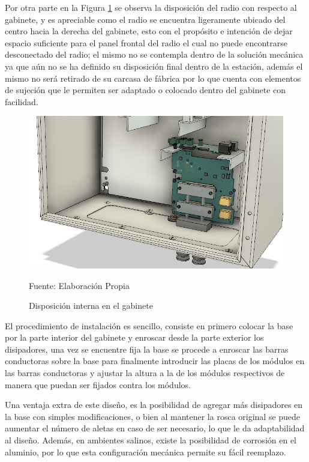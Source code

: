 Por otra parte en la Figura \ref{solucion4} se observa la disposición del radio con respecto al gabinete, y es apreciable como el radio se encuentra ligeramente ubicado del centro hacia la derecha del gabinete, esto con el propósito e intención de dejar espacio suficiente para el panel frontal del radio el cual no puede encontrarse desconectado del radio; el mismo no se contempla dentro de la solución mecánica ya que aún no se ha definido su disposición final dentro de la estación, además el mismo no será retirado de su carcasa de fábrica por lo que cuenta con elementos de sujeción que le permiten ser adaptado o colocado dentro del gabinete con facilidad.

\begin{figure}[H]
\centering
\includegraphics[scale=0.5]{Figuras/G9.png}
\caption{Disposición interna en el gabinete}
Fuente: Elaboración Propia
\label{solucion4}
\end{figure}

El procedimiento de instalación es sencillo, consiste en primero colocar la base por la parte interior del gabinete y enroscar desde la parte exterior los disipadores, una vez se encuentre fija la base se procede a enroscar las barras conductoras sobre la base para finalmente introducir las placas de los módulos en las barras conductoras y ajustar la altura a la de los módulos respectivos de manera que puedan ser fijados contra los módulos.

Una ventaja extra de este diseño, es la posibilidad de agregar más disipadores en la base con simples modificaciones, o bien al mantener la rosca original se puede aumentar el número de aletas en caso de ser necesario, lo que le da adaptabilidad al diseño. Además, en ambientes salinos, existe la posibilidad de corrosión en el aluminio, por lo que esta configuración mecánica permite su fácil reemplazo.

